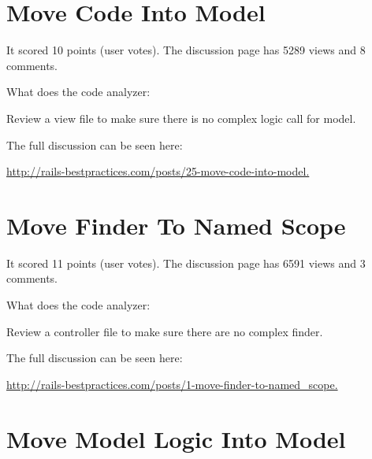 \section{Move Code Into Model}


It scored 10 points (user votes). 
The discussion page has 5289 views and 8 comments.

What does the code analyzer:

Review a view file to make sure there is no complex logic call for model.

The full discussion can be seen here:

\url{http://rails-bestpractices.com/posts/25-move-code-into-model.}

     
\section{Move Finder To Named Scope}


It scored 11 points (user votes). 
The discussion page has 6591 views and 3 comments.

What does the code analyzer:

Review a controller file to make sure there are no complex finder.

The full discussion can be seen here:

\url{http://rails-bestpractices.com/posts/1-move-finder-to-named_scope.}

\section{Move Model Logic Into Model}

